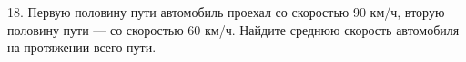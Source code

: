 18. Первую половину пути автомобиль проехал со скоростью 90 км/ч, вторую половину пути --- со скоростью 60 км/ч. Найдите среднюю скорость автомобиля на протяжении всего пути.\\
